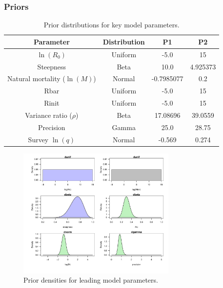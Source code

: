 \begin{frame}[c,allowframebreaks]\frametitle{Priors}
	
	\begin{table}
	\caption{Prior distributions for key model parameters.}
	\begin{tabular}{cccc}
		\hline
		Parameter & Distribution  & P1 & P2 \\
		\hline
		$\ln(R_0)$ & Uniform &  -5.0 & 15 \\
		Steepness & Beta &  10.0 & 4.925373\\
		Natural mortality ($\ln(M)$) &  Normal &   -0.7985077 & 0.2\\
		Rbar & Uniform &  -5.0 & 15 \\
		Rinit & Uniform &   -5.0 & 15 \\
		Variance ratio ($\rho$) & Beta & 17.08696 & 39.0559 \\
		Precision & Gamma &  25.0 & 28.75\\
		Survey $\ln(q)$ &Normal &  -0.569 & 0.274\\
		\hline
	\end{tabular}	
	\end{table}
	
	\begin{figure}[htbp]
		\centering
		\includegraphics[width=0.7\textwidth]{../FIGS/qPriorFigs/iscam_fig_theta_prior_density.pdf}
		\caption{Prior densities for leading model parameters.}
		\label{fig:priors}
	\end{figure}
\end{frame}



%
